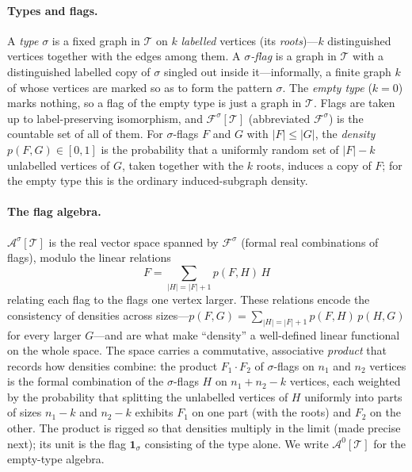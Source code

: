 \documentclass[11pt]{article}
\theoremstyle{definition}
\newcommand{\A}{\mathcal{A}}
\newcommand{\F}{\mathcal{F}}
\newcommand{\T}{\mathcal{T}}
\newcommand{\one}{\mathbf 1}
\begin{document}
\paragraph{Types and flags.}
A \emph{type} $\sigma$ is a fixed graph in $\T$ on $k$ \emph{labelled} vertices
(its \emph{roots})---$k$ distinguished vertices together with the edges among
them.  A \emph{$\sigma$-flag} is a graph in $\T$ with a distinguished labelled copy
of $\sigma$ singled out inside it---informally, a finite graph $k$ of whose vertices
are marked so as to form the pattern $\sigma$.  The \emph{empty type} ($k=0$) marks
nothing, so a flag of the empty type is just a graph in $\T$.  Flags are taken up to
label-preserving isomorphism, and $\F^\sigma[\T]$ (abbreviated $\F^\sigma$) is the
countable set of all of them.  For $\sigma$-flags $F$ and $G$ with $|F|\le|G|$, the
\emph{density} $p(F,G)\in[0,1]$ is the probability that a uniformly random set of $|F|-k$
unlabelled vertices of $G$, taken together with the $k$ roots, induces a copy of $F$; for
the empty type this is the ordinary induced-subgraph density.

\paragraph{The flag algebra.}
$\A^\sigma[\T]$ is the real vector space spanned by $\F^\sigma$ (formal real combinations
of flags), modulo the linear relations
\[
  F=\sum_{|H|=|F|+1}p(F,H)\,H
\]
relating each flag to the flags one vertex larger.  These relations encode the
consistency of densities across sizes---$p(F,G)=\sum_{|H|=|F|+1}p(F,H)\,p(H,G)$ for every
larger $G$---and are what make ``density'' a well-defined linear functional on the whole
space.  The space
carries a commutative, associative \emph{product} that records how densities combine: the
product $F_1\cdot F_2$ of $\sigma$-flags on $n_1$ and $n_2$ vertices is the formal
combination of the $\sigma$-flags $H$ on $n_1+n_2-k$ vertices, each weighted by the
probability that splitting the unlabelled vertices of $H$ uniformly into parts of sizes
$n_1-k$ and $n_2-k$ exhibits $F_1$ on one part (with the roots) and $F_2$ on the other.
The product is rigged so that densities multiply in the limit (made precise next); its
unit is the flag $\one_\sigma$ consisting of the type alone.  We write $\A^0[\T]$ for the
empty-type algebra.
\end{document}
